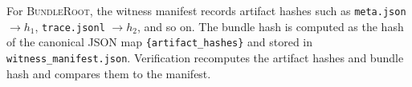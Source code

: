 \documentclass[11pt]{article}
\newcommand{\BundleRoot}{\textsc{BundleRoot}}
\begin{document}
For \BundleRoot, the witness manifest records artifact hashes such as
\texttt{meta.json} $\rightarrow h_1$, \texttt{trace.jsonl} $\rightarrow h_2$, and so on.
The bundle hash is computed as the hash of the canonical JSON map
\texttt{\{artifact\_hashes\}} and stored in \texttt{witness\_manifest.json}. Verification
recomputes the artifact hashes and bundle hash and compares them to the manifest.



\end{document}
